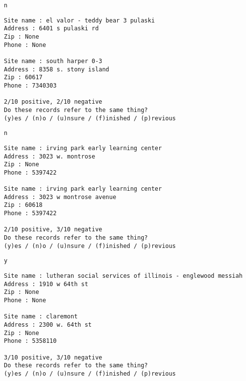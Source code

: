 \documentclass[11pt]{article}
\begin{document}
    \begin{Verbatim}[commandchars=\\\{\}]
n

    \end{Verbatim}

    \begin{Verbatim}[commandchars=\\\{\}]
Site name : el valor - teddy bear 3 pulaski
Address : 6401 s pulaski rd
Zip : None
Phone : None

Site name : south harper 0-3
Address : 8358 s. stony island
Zip : 60617
Phone : 7340303

2/10 positive, 2/10 negative
Do these records refer to the same thing?
(y)es / (n)o / (u)nsure / (f)inished / (p)revious

    \end{Verbatim}

    \begin{Verbatim}[commandchars=\\\{\}]
n

    \end{Verbatim}

    \begin{Verbatim}[commandchars=\\\{\}]
Site name : irving park early learning center
Address : 3023 w. montrose
Zip : None
Phone : 5397422

Site name : irving park early learning center
Address : 3023 w montrose avenue
Zip : 60618
Phone : 5397422

2/10 positive, 3/10 negative
Do these records refer to the same thing?
(y)es / (n)o / (u)nsure / (f)inished / (p)revious

    \end{Verbatim}

    \begin{Verbatim}[commandchars=\\\{\}]
y

    \end{Verbatim}

    \begin{Verbatim}[commandchars=\\\{\}]
Site name : lutheran social services of illinois - englewood messiah
Address : 1910 w 64th st
Zip : None
Phone : None

Site name : claremont
Address : 2300 w. 64th st
Zip : None
Phone : 5358110

3/10 positive, 3/10 negative
Do these records refer to the same thing?
(y)es / (n)o / (u)nsure / (f)inished / (p)revious

    \end{Verbatim}
\end{document}
